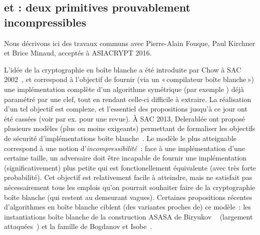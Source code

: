 \subsection{\pc et \cdb : deux primitives prouvablement incompressibles \cite{puppycipher}}

Nous décrivons ici des travaux communs avec Pierre-Alain Fouque, Paul Kirchner et Brice Minaud, acceptés à ASIACRYPT 2016.

\medskip

L'idée de la cryptographie en boîte blanche a été introduite par Chow \etal à SAC 2002~\cite{DBLP:conf/sacrypt/ChowEJO02},
et correspond à l'objectif de fournir (via un «\,compilateur boîte blanche\,») une implémentation complète d'un algorithme symétrique (par exemple \aes) déjà paramétré par
une clef, tout en rendant celle-ci difficile à extraire. La réalisation d'un tel objectif est complexe, et l'essentiel des propositions
jusqu'à ce jour ont été cassées (voir par ex. \cite{HenriWB} pour une revue).
À SAC 2013, Delerablée \etal ont proposé plusieurs modèles (plus ou moins exigeants) permettant de formaliser les objectifs de sécurité d'implémentations boîte blanche~\cite{DBLP:conf/sacrypt/DelerableeLPR13}.
Le modèle le plus atteignable correspond à une notion d'\emph{incompressibilité}~: face à une implémentation d'une certaine taille, un adversaire doit être incapable de fournir une implémentation
(significativement) plus petite qui est fonctionellement équivalente (avec très forte probabilité). Cet objectif est relativement facile à atteindre, mais ne satisfait pas nécessairement
tous les emplois qu'on pourrait souhaiter faire de la cryptographie boîte blanche (qui restent au demeurant vagues). Certaines propositions récentes d'algorithmes en boîte blanche ciblent
(des variantes proches de) ce modèle~: les instantiations boîte blanche de la construction ASASA de Biryukov \etal~\cite{DBLP:conf/asiacrypt/BiryukovBK14}
(largement attaquées~\cite{DBLP:journals/iacr/DinurDKL15,DBLP:conf/asiacrypt/MinaudDFK15}) et la famille \spacehard de Bogdanov et Isobe~\cite{DBLP:conf/ccs/BogdanovI15}.


